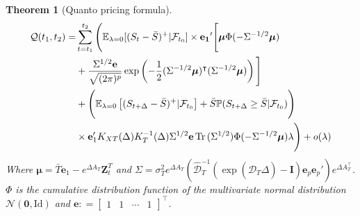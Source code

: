 \documentclass[10pt,a4paper,reqno]{amsart}
\newtheorem{theorem}{Theorem}[section]
\theoremstyle{example}
\DeclareMathOperator\Tr{Tr}
\newcommand{\Id}{\mathrm{Id}}
\newcommand{\opI}{\mathbf{I}}
\begin{document}
\begin{theorem}[Quanto pricing formula]\label{thm:Quanto-CARMA-Pricer}
    \begin{align}
        \mathcal{Q}(t_1,t_2)=&\sum_{t=t_1}^{t_2}\Bigg( \mathbb{E}_{\lambda=0}[(S_t-\Bar{S})^+|\mathcal{F}_{t_0}]\times\mathbf{e_1}'\Bigg[\boldsymbol{\mu}\Phi(-\Sigma^{-1/2}\boldsymbol{\mu}) \nonumber\\
        &+ \frac{\Sigma^{1/2}\mathbf{e}}{\sqrt{(2\pi)^p}}\exp\left(-\frac{1}{2}(\Sigma^{-1/2}\boldsymbol{\mu})^\intercal(\Sigma^{-1/2}\boldsymbol{\mu})\right)\Bigg]\nonumber\\
        &+\Bigg(\mathbb{E}_{\lambda=0}\left[(S_{t+\Delta}-\Bar{S})^+|\mathcal{F}_{t_0}\right]+\Bar{S}\mathbb{P}(S_{t+\Delta}\geq\Bar{S}|\mathcal{F}_{t_0})\Bigg)\nonumber\\
        &\times\mathbf{e}_1'K_{XT}(\Delta)K_T^{-1}(\Delta)\Sigma^{1/2}\mathbf{e}\Tr{(\Sigma^{1/2})}\Phi(-\Sigma^{-1/2}\boldsymbol{\mu})\lambda\Bigg)+o(\lambda)\nonumber
    \end{align}
    Where $\boldsymbol\mu=\bar{T}\textbf{e}_1-e^{\Delta A_T}\textbf{Z}_t^T$ and $\Sigma = \sigma_T^2e^{\Delta A_T}\left(\hat{\mathcal{D}}_{T}^{-1}\left(\exp(\hat{\mathcal{D}}_{T}\Delta)-\opI\right)\textbf{e}_p \textbf{e}_p'
    \right)e^{\Delta A_T^\intercal}$. $\Phi$ is the cumulative distribution function of the multivariate normal distribution $\mathcal{N}(\textbf{0},\Id)$ and $\mathbf{e}: = \begin{bmatrix} 1 & 1 & \cdots & 1 \end{bmatrix}^\intercal$.
\end{theorem}
\end{document}
